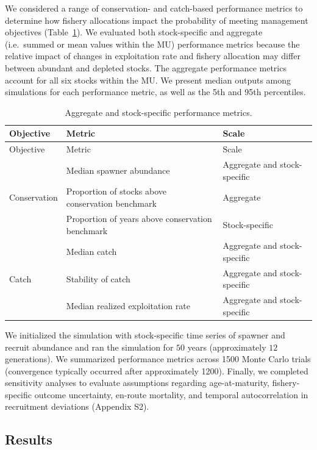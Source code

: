 \documentclass[11pt]{book}
\begin{document}
We considered a range of conservation- and catch-based performance metrics to determine how fishery allocations impact the probability of meeting management objectives (Table~\ref{tab:pmTable}). We evaluated both stock-specific and aggregate (i.e.~summed or mean values within the MU) performance metrics because the relative impact of changes in exploitation rate and fishery allocation may differ between abundant and depleted stocks. The aggregate performance metrics account for all six stocks within the MU. We present median outputs among simulations for each performance metric, as well as the 5th and 95th percentiles.
\begin{longtable}[]{@{}lll@{}}
\caption{\label{tab:pmTable}Aggregate and stock-specific performance metrics.}\tabularnewline
\toprule
Objective & Metric & Scale\tabularnewline
\midrule
\endfirsthead
\toprule
Objective & Metric & Scale\tabularnewline
\midrule
\endhead
& Median spawner abundance & Aggregate and stock-specific\tabularnewline
Conservation & Proportion of stocks above conservation benchmark & Aggregate\tabularnewline
& Proportion of years above conservation benchmark & Stock-specific\tabularnewline
& Median catch & Aggregate and stock-specific\tabularnewline
Catch & Stability of catch & Aggregate and stock-specific\tabularnewline
& Median realized exploitation rate & Aggregate and stock-specific\tabularnewline
\bottomrule
\end{longtable}
We initialized the simulation with stock-specific time series of spawner and recruit abundance and ran the simulation for \(50\) years (approximately \(12\) generations). We summarized performance metrics across 1500 Monte Carlo trials (convergence typically occurred after approximately 1200). Finally, we completed sensitivity analyses to evaluate assumptions regarding age-at-maturity, fishery-specific outcome uncertainty, en-route mortality, and temporal autocorrelation in recruitment deviations (Appendix S2).

\subsection{Results}\label{results}
\end{document}
